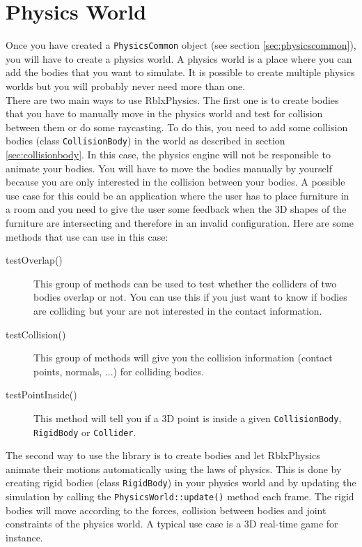 \documentclass[a4paper,12pt]{article}
\begin{document}
   \section{Physics World}
     \label{sec:physicsworld}

    Once you have created a \texttt{PhysicsCommon} object (see section \ref{sec:physicscommon}), you will have to create a physics world. A physics world is
    a place where you can add the bodies that you want to simulate. It is possible to create multiple physics worlds but you will probably never need more
    than one. \\

    There are two main ways to use RblxPhysics. The first one is to create bodies that you have to manually move in the physics world and test for
    collision between them or do some raycasting. To do this, you need to add some collision bodies (class \texttt{CollisionBody}) in the world as
    described in section \ref{sec:collisionbody}. In this case, the physics engine will not be responsible to animate your bodies. You will have to move
    the bodies manually by yourself because you are only interested in the collision between your bodies. A possible use case for this could be an
    application where the user has to place furniture in a room and you need to give the user some feedback when the 3D shapes of the furniture are
    intersecting and therefore in an invalid configuration. Here are some methods that use can use in this case: \\
    
    \begin{description}
       \item[testOverlap()] This group of methods can be used to test whether the colliders of two bodies overlap or not. You can use this if you just want to
	       know if bodies are colliding but your are not interested in the contact information. 
       \item[testCollision()] This group of methods will give you the collision information (contact points, normals, ...) for colliding bodies.
       \item[testPointInside()] This method will tell you if a 3D point is inside a given \texttt{CollisionBody}, \texttt{RigidBody} or \texttt{Collider}. 
    \end{description}

    The second way to use the library is to create bodies and let RblxPhysics animate their motions automatically using the laws of physics. This is
    done by creating rigid bodies (class \texttt{RigidBody}) in your physics world and by updating the simulation by calling the 
    \texttt{PhysicsWorld::update()} method each frame. The rigid bodies will move according to the forces, collision between bodies and joint constraints of
    the physics world. A typical use case is a 3D real-time game for instance.
\end{document}
